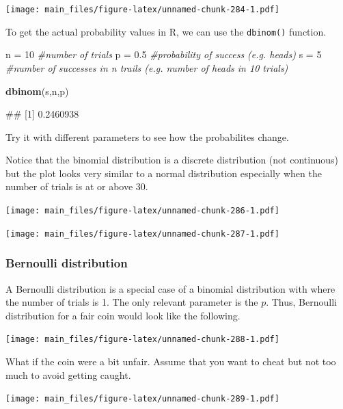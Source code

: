 \documentclass[
]{book}
\newenvironment{Shaded}{\begin{snugshade}}{\end{snugshade}}
\newcommand{\CommentTok}[1]{\textcolor[rgb]{0.56,0.35,0.01}{\textit{#1}}}
\newcommand{\DecValTok}[1]{\textcolor[rgb]{0.00,0.00,0.81}{#1}}
\newcommand{\FloatTok}[1]{\textcolor[rgb]{0.00,0.00,0.81}{#1}}
\newcommand{\FunctionTok}[1]{\textcolor[rgb]{0.13,0.29,0.53}{\textbf{#1}}}
\newcommand{\NormalTok}[1]{#1}
\newcommand{\OtherTok}[1]{\textcolor[rgb]{0.56,0.35,0.01}{#1}}
\begin{document}
\texttt{[image: main\_files/figure-latex/unnamed-chunk-284-1.pdf]}

To get the actual probability values in R, we can use the \texttt{dbinom()} function.

\begin{Shaded}
\begin{Highlighting}[]
\NormalTok{n }\OtherTok{=} \DecValTok{10} \CommentTok{\#number of trials}
\NormalTok{p }\OtherTok{=} \FloatTok{0.5} \CommentTok{\#probability of success (e.g. heads)}
\NormalTok{s }\OtherTok{=} \DecValTok{5} \CommentTok{\#number of successes in n trails (e.g. number of heads in 10 trials)}

\FunctionTok{dbinom}\NormalTok{(s,n,p)}
\end{Highlighting}
\end{Shaded}

\begin{Shaded}
\begin{Highlighting}[]
\NormalTok{\#\# [1] 0.2460938}
\end{Highlighting}
\end{Shaded}

Try it with different parameters to see how the probabilites change.

Notice that the binomial distribution is a discrete distribution (not continuous) but the plot looks very similar to a normal distribution especially when the number of trials is at or above 30.

\texttt{[image: main\_files/figure-latex/unnamed-chunk-286-1.pdf]}

\texttt{[image: main\_files/figure-latex/unnamed-chunk-287-1.pdf]}

\subsubsection{Bernoulli distribution}\label{bernoulli-distribution}

A Bernoulli distribution is a special case of a binomial distribution with where the number of trials is 1. The only relevant parameter is the \(p\). Thus, Bernoulli distribution for a fair coin would look like the following.

\texttt{[image: main\_files/figure-latex/unnamed-chunk-288-1.pdf]}

What if the coin were a bit unfair. Assume that you want to cheat but not too much to avoid getting caught.

\texttt{[image: main\_files/figure-latex/unnamed-chunk-289-1.pdf]}
\end{document}
